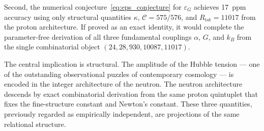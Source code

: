\documentclass[11pt,a4paper]{article}
\theoremstyle{definition}
\newcommand{\Rtot}{R_{\mathrm{tot}}}
\newcommand{\epsg}{\varepsilon_G}
\newcommand{\calC}{\mathcal{C}}
\newcommand{\kap}{\kappa}
\begin{document}
Second, the numerical conjecture~\eqref{eq:eps_conjecture} for $\epsg$ achieves 17~ppm accuracy using only structural quantities $\kap$, $\calC = 575/576$, and $\Rtot = 11017$ from the proton architecture. If proved as an exact identity, it would complete the parameter-free derivation of all three fundamental couplings $\alpha$, $G$, and $k_B$ from the single combinatorial object $(24, 28, 930, 10087, 11017)$.

The central implication is structural. The amplitude of the Hubble tension --- one of the outstanding observational puzzles of contemporary cosmology --- is encoded in the integer architecture of the neutron. The neutron architecture descends by exact combinatorial derivation from the same proton quintuplet that fixes the fine-structure constant and Newton's constant. These three quantities, previously regarded as empirically independent, are projections of the same relational structure.



\end{document}

